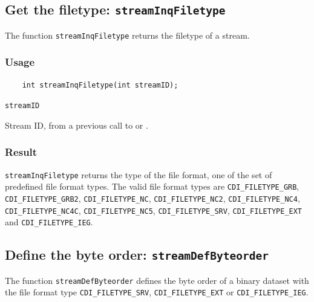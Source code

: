 \subsection{Get the filetype: \texttt{streamInqFiletype}}
\label{streamInqFiletype}

The function {\texttt{streamInqFiletype}} returns the filetype of a stream.

\subsubsection*{Usage}

\begin{verbatim}
    int streamInqFiletype(int streamID);
\end{verbatim}

\hspace*{4mm}\begin{minipage}[]{15cm}
\begin{deflist}{\texttt{streamID}\ }
\item[\texttt{streamID}]
Stream ID, from a previous call to {} or {}.

\end{deflist}
\end{minipage}

\subsubsection*{Result}

{\texttt{streamInqFiletype}} returns the type of the file format,
one of the set of predefined {\CDI} file format types.
The valid {\CDI} file format types are {\texttt{CDI\_FILETYPE\_GRB}}, {\texttt{CDI\_FILETYPE\_GRB2}}, {\texttt{CDI\_FILETYPE\_NC}},
{\texttt{CDI\_FILETYPE\_NC2}},
{\texttt{CDI\_FILETYPE\_NC4}}, {\texttt{CDI\_FILETYPE\_NC4C}}, {\texttt{CDI\_FILETYPE\_NC5}}, {\texttt{CDI\_FILETYPE\_SRV}}, {\texttt{CDI\_FILETYPE\_EXT}} and
{\texttt{CDI\_FILETYPE\_IEG}}.



\subsection{Define the byte order: \texttt{streamDefByteorder}}
\label{streamDefByteorder}

The function {\texttt{streamDefByteorder}} defines the byte order of a binary dataset
with the file format type {\texttt{CDI\_FILETYPE\_SRV}}, {\texttt{CDI\_FILETYPE\_EXT}} or {\texttt{CDI\_FILETYPE\_IEG}}.

